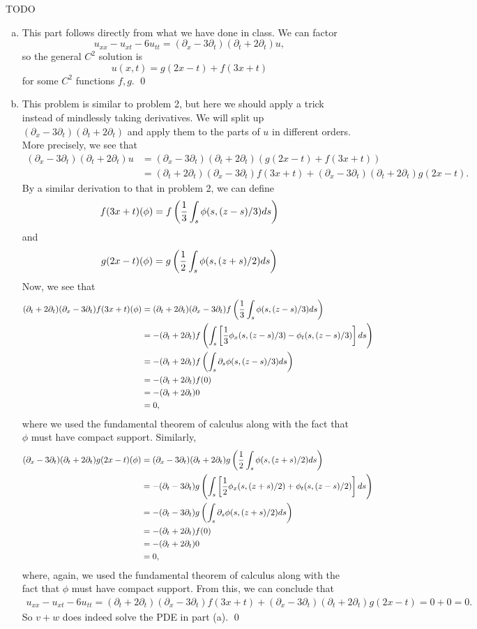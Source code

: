\documentclass{article}
\renewcommand{\d}{\partial}
\begin{document}
\newpage
{} TODO \tri
\hop
\solution
\begin{enumerate}[(a)]
    \item This part follows directly from what we have done in class. We can factor 
    \[u_{xx}-u_{xt}-6u_{tt} = (\d_x - 3\d_t)(\d_t + 2\d_t)u,\]
    so the general $C^2$ solution is 
    \[u(x,t) = g(2x-t) + f(3x + t)\]
    for some $C^2$ functions $f,g$. \qed
    \item This problem is similar to problem 2, but here we should apply a trick instead of mindlessly taking derivatives. We will split up $ (\d_x - 3\d_t)(\d_t + 2\d_t)$ and apply them to the parts of $u$ in different orders. More precisely, we see that 
    \begin{align*}
        (\d_x - 3\d_t)(\d_t + 2\d_t)u &= (\d_x - 3\d_t)(\d_t + 2\d_t)( g(2x-t) + f(3x + t)) \\ 
        &= (\d_t + 2\d_t)(\d_x - 3\d_t)f(3x + t) +  (\d_x - 3\d_t)(\d_t + 2\d_t)g(2x-t).
    \end{align*}
    By a similar derivation to that in problem 2, we can define 
    \[f(3x+t)(\phi) = f\del{\frac{1}{3}\int_s \phi(s, (z-s)/3)ds}\]
    and 
    \[g(2x-t)(\phi) = g\del{\frac{1}{2}\int_s \phi(s, (z+s)/2)ds}\]
    Now, we see that 
    \begin{align*}
        (\d_t + 2\d_t)(\d_x - 3\d_t)f(3x + t)(\phi) &= (\d_t + 2\d_t)(\d_x - 3\d_t)f\del{\frac{1}{3}\int_s \phi(s, (z-s)/3)ds} \\
        &=-(\d_t + 2\d_t)f\del{\int_s \sbr{\frac{1}{3}\phi_x(s, (z-s)/3) - \phi_t(s, (z-s)/3)}ds}\\
        &= -(\d_t + 2\d_t)f\del{\int_s \d_s \phi(s, (z-s)/3)ds} \\
        &= -(\d_t + 2\d_t)f(0)\\
        &= -(\d_t + 2\d_t)0\\
        &=0,
    \end{align*}
    where we used the fundamental theorem of calculus along with the fact that $\phi$ must have compact support. 
    \hop 
    Similarly,
    \begin{align*}
        (\d_x - 3\d_t)(\d_t + 2\d_t)g(2x - t)(\phi) &= (\d_x - 3\d_t)(\d_t + 2\d_t)g\del{\frac{1}{2}\int_s \phi(s, (z+s)/2)ds} \\
        &=-(\d_t - 3\d_t)g\del{\int_s \sbr{\frac{1}{2}\phi_x(s, (z+s)/2) + \phi_t(s, (z-s)/2)}ds}\\
        &= -(\d_t - 3\d_t)g\del{\int_s \d_s \phi(s, (z+s)/2)ds} \\
        &= -(\d_t + 2\d_t)f(0)\\
        &= -(\d_t + 2\d_t)0\\
        &=0,
    \end{align*}
    where, again, we used the fundamental theorem of calculus along with the fact that $\phi$ must have compact support. 
    \hop 
    From this, we can conclude that 
    \begin{align*}
        u_{xx}-u_{xt}-6u_{tt} = (\d_t + 2\d_t)(\d_x - 3\d_t)f(3x + t) +  (\d_x - 3\d_t)(\d_t + 2\d_t)g(2x-t) = 0+0 = 0.
    \end{align*}
    So $v+w$ does indeed solve the PDE in part (a). \qed
\end{enumerate}
\end{document}
